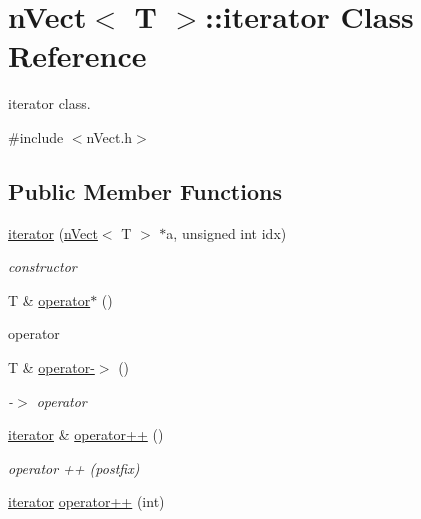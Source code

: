 \hypertarget{classnVect_1_1iterator}{}\section{n\+Vect$<$ T $>$\+:\+:iterator Class Reference}
\label{classnVect_1_1iterator}


iterator class.  




{\ttfamily \#include $<$n\+Vect.\+h$>$}

\subsection*{Public Member Functions}
\begin{DoxyCompactItemize}
\item 
\hyperlink{classnVect_1_1iterator_a8e19f7baeffbc2b8320f4b530be16d86}{iterator} (\hyperlink{classnVect}{n\+Vect}$<$ T $>$ $\ast$a, unsigned int idx)
\begin{DoxyCompactList}\small\item\em constructor \end{DoxyCompactList}\item 
T \& \hyperlink{classnVect_1_1iterator_a03ab1ec9dbcf379a4c0723536d763306}{operator$\ast$} ()
\begin{DoxyCompactList}\small\item\em 
\begin{DoxyItemize}
\item operator 
\end{DoxyItemize}\end{DoxyCompactList}\item 
T \& \hyperlink{classnVect_1_1iterator_a58333e36f3e8bc4519b41667dbf4a710}{operator-\/$>$} ()
\begin{DoxyCompactList}\small\item\em -\/$>$ operator \end{DoxyCompactList}\item 
\hyperlink{classnVect_1_1iterator}{iterator} \& \hyperlink{classnVect_1_1iterator_a92ca21ca2cc2d12095cafccf7c0d1e8f}{operator++} ()
\begin{DoxyCompactList}\small\item\em operator ++ (postfix) \end{DoxyCompactList}\item 
\hyperlink{classnVect_1_1iterator}{iterator} \hyperlink{classnVect_1_1iterator_aa77cebd3d9132f8490609d9522be8b26}{operator++} (int)

\end{DoxyCompactItemize}
